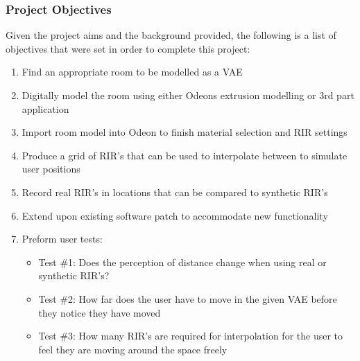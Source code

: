 \documentclass[../../main.tex]{subfiles}
\begin{document}


	\subsubsection{Project Objectives}



		Given the project aims and the background provided, the following is a list of objectives that were set in order to complete this project:

		\begin{enumerate}
			\item Find an appropriate room to be modelled as a \ac{VAE} \\
			\item Digitally model the room using either Odeons extrusion modelling or 3rd part application \\
			\item Import room model into Odeon to finish material selection and \ac{RIR} settings\\
			\item Produce a grid of \ac{RIR}'s that can be used to interpolate between to simulate user positions\\
			\item Record real \ac{RIR}'s in locations that can be compared to synthetic \ac{RIR}'s\\
			\item Extend upon existing software patch to accommodate new functionality\\
			\item Preform user tests:
				\begin{itemize}
					\item Test \#1: Does the perception of distance change when using real or synthetic \ac{RIR}'s?\\
					\item Test \#2: How far does the user have to move in the given \ac{VAE} before they notice they have moved \\
					\item Test \#3: How many \ac{RIR}'s are required for interpolation for the user to feel they are moving around the space freely\\
				\end{itemize}
			\end{enumerate}
\end{document}
